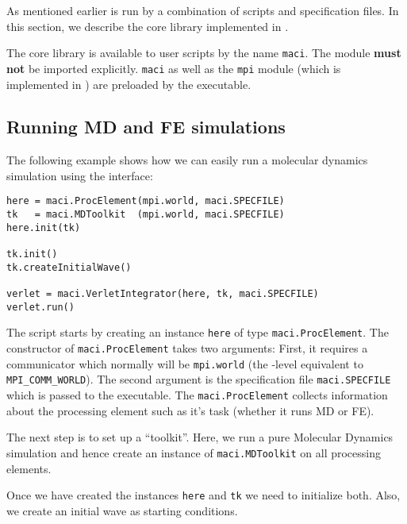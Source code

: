 
As mentioned earlier \MACI is run by a combination of \PYTHON scripts and \XML specification files. In this section, we describe the \MACI core library implemented in \PYTHON.\newline

The \MACI core library is available to user scripts by the name \lstinline[style=SHELL]|maci|. The module \textbf{must not} be imported explicitly.  \lstinline[style=SHELL]|maci| as well as the \lstinline[style=SHELL]|mpi| module (which is implemented in \WMPI) are preloaded by the \MACI executable. 

\subsection{Running MD and FE simulations}

The following example shows how we can easily run a molecular dynamics simulation using the \MACI interface:

\begin{lstlisting}[style=PYTHON_SMALL,frame=lines]
here = maci.ProcElement(mpi.world, maci.SPECFILE)
tk   = maci.MDToolkit  (mpi.world, maci.SPECFILE)
here.init(tk)

tk.init()
tk.createInitialWave()

verlet = maci.VerletIntegrator(here, tk, maci.SPECFILE)
verlet.run()
\end{lstlisting}

The script starts by creating an instance \lstinline[style=PYTHON]|here| of type \lstinline[style=PYTHON]|maci.ProcElement|. The constructor of \lstinline[style=PYTHON]|maci.ProcElement| takes two arguments: First, it requires a communicator which normally will be \lstinline[style=PYTHON]|mpi.world| (the \PYTHON-level equivalent to \lstinline[style=CODE]|MPI_COMM_WORLD|). The second argument is the specification file \lstinline[style=PYTHON]|maci.SPECFILE| which is passed to the executable. The \lstinline[style=PYTHON]|maci.ProcElement| collects information about the processing element such as it's task (whether it runs MD or FE).

The next step is to set up a ``toolkit''. Here, we run a pure Molecular Dynamics simulation and hence create an instance of \lstinline[style=PYTHON]|maci.MDToolkit| on all processing elements. 

Once we have created the instances \lstinline[style=PYTHON]|here| and \lstinline[style=PYTHON]|tk| we need to initialize both. Also, we create an initial wave as starting conditions. 

